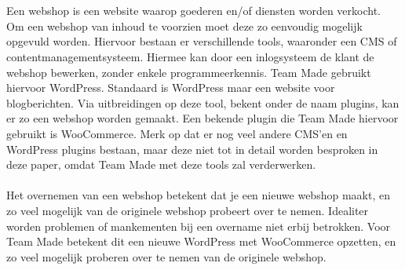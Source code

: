 
\chapter{}%
\label{ch:inleiding}

%

Een webshop is een website waarop goederen en/of diensten worden verkocht. Om een webshop van inhoud te voorzien moet deze zo eenvoudig mogelijk opgevuld worden. Hiervoor bestaan er verschillende tools, waaronder een CMS of contentmanagementsysteem. Hiermee kan door een inlogsysteem de klant de webshop bewerken, zonder enkele programmeerkennis. Team Made gebruikt hiervoor WordPress. Standaard is WordPress maar een website voor blogberichten. Via uitbreidingen op deze tool, bekent onder de naam plugins, kan er zo een webshop worden gemaakt. Een bekende plugin die Team Made hiervoor gebruikt is WooCommerce. Merk op dat er nog veel andere CMS'en en WordPress plugins bestaan, maar deze niet tot in detail worden besproken in deze paper, omdat Team Made met deze tools zal verderwerken. 
\\\\
Het overnemen van een webshop betekent dat je een nieuwe webshop maakt, en zo veel mogelijk van de originele webshop probeert over te nemen. Idealiter worden problemen of mankementen bij een overname niet erbij betrokken. Voor Team Made betekent dit een nieuwe WordPress met WooCommerce opzetten, en zo veel mogelijk proberen over te nemen van de originele webshop.

